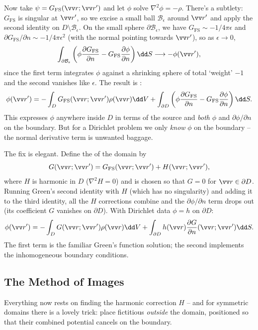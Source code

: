 Now take $\psi = G_{\text{FS}}(\vv r; \vv r')$ and let $\phi$ solve $\nabla^2 \phi = -\rho$. There's a subtlety: $G_{\text{FS}}$ is singular at $\vv r'$, so we excise a small ball $\mathcal{B}_\epsilon$ around $\vv r'$ and apply the second identity on $D \setminus \mathcal{B}_\epsilon$. On the small sphere $\partial \mathcal{B}_\epsilon$, we have $G_{\text{FS}} \sim -1/4\pi\epsilon$ and $\partial G_{\text{FS}}/\partial n \sim -1/4 \pi \epsilon^2$ (with the normal pointing towards $\vv r'$), so as $\epsilon \to 0$,
$$
\int_{\partial \mathcal{B}_\epsilon} \left(\phi \frac{\partial G_{\text{FS}}}{\partial n} - G_{\text{FS}} \frac{\partial \phi}{\partial n}\right) \dd S \longrightarrow -\phi(\vv r'),
$$
since the first term integrates $\phi$ against a shrinking sphere of total `weight' $-1$ and the second vanishes like $\epsilon$. The result is :
$$
\phi(\vv r') = -\int_D G_{\text{FS}}(\vv r; \vv r') \rho(\vv r) \dd V + \int_{\partial D} \left(\phi \frac{\partial G_{\text{FS}}}{\partial n} - G_{\text{FS}} \frac{\partial \phi}{\partial n}\right) \dd S.
$$
This expresses $\phi$ anywhere inside $D$ in terms of the source and \emph{both} $\phi$ and $\partial \phi/\partial n$ on the boundary. But for a Dirichlet problem we only \emph{know} $\phi$ on the boundary -- the normal derivative term is unwanted baggage.

The fix is elegant. Define the  of the domain by
$$
G(\vv r; \vv r') = G_{\text{FS}}(\vv r; \vv r') + H(\vv r; \vv r'),
$$
where $H$ is harmonic in $D$ ($\nabla^2 H = 0$) and is chosen so that $G = 0$ for $\vv r \in \partial D$. Running Green's second identity with $H$ (which has no singularity) and adding it to the third identity, all the $H$ corrections combine and the $\partial \phi/\partial n$ term drops out (its coefficient $G$ vanishes on $\partial D$). With Dirichlet data $\phi = h$ on $\partial D$:
$$
\phi(\vv r') = -\int_D G(\vv r; \vv r') \rho(\vv r) \dd V + \int_{\partial D} h(\vv r) \frac{\partial G}{\partial n}(\vv r; \vv r') \dd S.
$$
The first term is the familiar Green's function solution; the second implements the inhomogeneous boundary conditions.

\subsection{The Method of Images}

Everything now rests on finding the harmonic correction $H$ -- and for symmetric domains there is a lovely trick: place fictitious  \emph{outside} the domain, positioned so that their combined potential cancels on the boundary.

